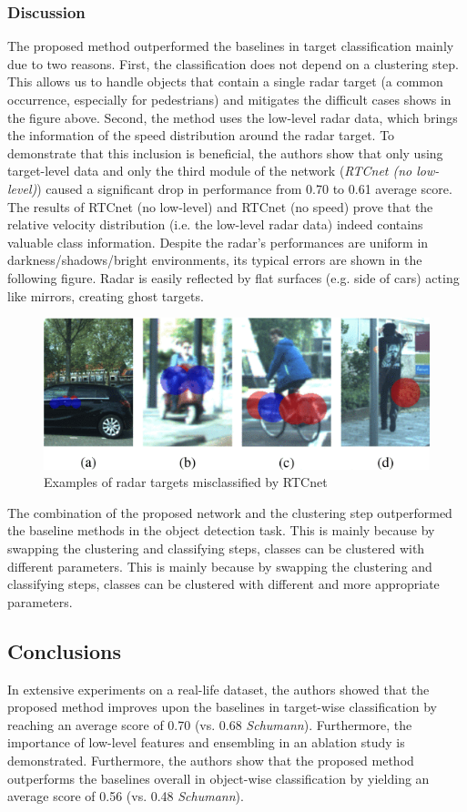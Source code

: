 \subsubsection{Discussion}\label{header-n528}

The proposed method outperformed the baselines in target classification
mainly due to two reasons. First, the classification does not depend on
a clustering step. This allows us to handle objects that contain a
single radar target (a common occurrence, especially for pedestrians)
and mitigates the difficult cases shows in the figure above. Second, the
method uses the low-level radar data, which brings the information of
the speed distribution around the radar target. To demonstrate that this
inclusion is beneficial, the authors show that only using target-level
data and only the third module of the network (\emph{RTCnet (no
low-level)}) caused a significant drop in performance from 0.70 to 0.61
average score. The results of RTCnet (no low-level) and RTCnet (no
speed) prove that the relative velocity distribution (i.e. the low-level
radar data) indeed contains valuable class information. Despite the
radar's performances are uniform in darkness/shadows/bright
environments, its typical errors are shown in the following figure.
Radar is easily reflected by flat surfaces (e.g. side of cars) acting
like mirrors, creating ghost targets.

\begin{figure}[h!]
\centering
\includegraphics[width=0.85\linewidth]{images/rtcnetfails.png}
\caption{Examples of radar targets misclassified by RTCnet}
\end{figure}

The combination of the proposed network and the clustering step
outperformed the baseline methods in the object detection task. This is
mainly because by swapping the clustering and classifying steps, classes
can be clustered with different parameters. This is mainly because by
swapping the clustering and classifying steps, classes can be clustered
with different and more appropriate parameters.

\subsection{Conclusions}\label{header-n532}

In extensive experiments on a real-life dataset, the authors showed that
the proposed method improves upon the baselines in target-wise
classification by reaching an average score of 0.70 (vs. 0.68
\emph{Schumann}). Furthermore, the importance of low-level features and
ensembling in an ablation study is demonstrated. Furthermore, the
authors show that the proposed method outperforms the baselines overall
in object-wise classification by yielding an average score of 0.56 (vs.
0.48 \emph{Schumann}).
